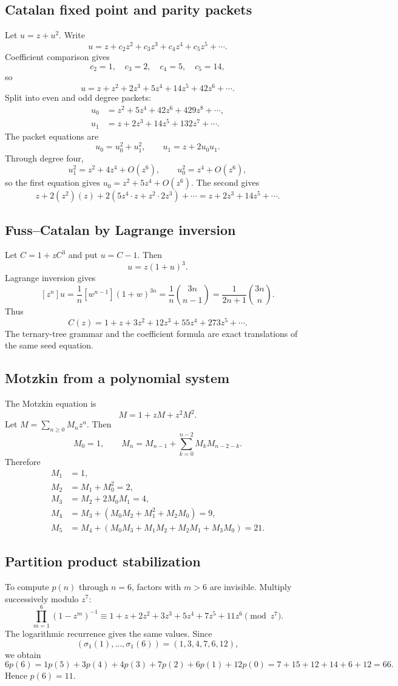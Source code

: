 \documentclass[11pt]{article}
\theoremstyle{definition}\newtheorem{definition}[theorem]{Definition}\newtheorem{example}[theorem]{Example}\newtheorem{construction}[theorem]{Construction}\newtheorem{algorithm}[theorem]{Algorithm}\newtheorem{conjecture}[theorem]{Conjecture}\newtheorem{problem}[theorem]{Problem}
\theoremstyle{remark}\newtheorem{remark}[theorem]{Remark}\newtheorem{boundary}[theorem]{Boundary}\newtheorem{certificate}[theorem]{Computational Certificate}\newtheorem{classical}[theorem]{Classical Input}\newtheorem{principle}[theorem]{Structural Principle}
\begin{document}
\subsection{Catalan fixed point and parity packets}
Let $u=z+u^2$.  Write
\[
 u=z+c_2z^2+c_3z^3+c_4z^4+c_5z^5+\cdots.
\]
Coefficient comparison gives
\[
 c_2=1,
 \quad c_3=2,
 \quad c_4=5,
 \quad c_5=14,
\]
so
\[
 u=z+z^2+2z^3+5z^4+14z^5+42z^6+\cdots.
\]
Split into even and odd degree packets:
\[
\begin{aligned}
 u_0&=z^2+5z^4+42z^6+429z^8+\cdots,\\
 u_1&=z+2z^3+14z^5+132z^7+\cdots.
\end{aligned}
\]
The packet equations are
\[
 u_0=u_0^2+u_1^2,
 \qquad
 u_1=z+2u_0u_1.
\]
Through degree four,
\[
 u_1^2=z^2+4z^4+O(z^6),
 \qquad
 u_0^2=z^4+O(z^6),
\]
so the first equation gives $u_0=z^2+5z^4+O(z^6)$.  The second gives
\[
 z+2(z^2)(z)+2(5z^4\cdot z+z^2\cdot2z^3)+\cdots
 =z+2z^3+14z^5+\cdots.
\]

\subsection{Fuss--Catalan by Lagrange inversion}
Let $C=1+zC^3$ and put $u=C-1$.  Then
\[
 u=z(1+u)^3.
\]
Lagrange inversion gives
\[
 [z^n]u=\frac1n[w^{n-1}](1+w)^{3n}
 =\frac1n\binom{3n}{n-1}
 =\frac1{2n+1}\binom{3n}{n}.
\]
Thus
\[
 C(z)=1+z+3z^2+12z^3+55z^4+273z^5+\cdots.
\]
The ternary-tree grammar and the coefficient formula are exact translations of the same seed equation.

\subsection{Motzkin from a polynomial system}
The Motzkin equation is
\[
 M=1+zM+z^2M^2.
\]
Let $M=\sum_{n\geq0}M_nz^n$.  Then
\[
 M_0=1,
 \qquad
 M_n=M_{n-1}+\sum_{k=0}^{n-2}M_kM_{n-2-k}.
\]
Therefore
\[
\begin{aligned}
M_1&=1,\\
M_2&=M_1+M_0^2=2,\\
M_3&=M_2+2M_0M_1=4,\\
M_4&=M_3+(M_0M_2+M_1^2+M_2M_0)=9,\\
M_5&=M_4+(M_0M_3+M_1M_2+M_2M_1+M_3M_0)=21.
\end{aligned}
\]

\subsection{Partition product stabilization}
To compute $p(n)$ through $n=6$, factors with $m>6$ are invisible.  Multiply successively modulo $z^7$:
\[
 \prod_{m=1}^{6}(1-z^m)^{-1}
 \equiv
 1+z+2z^2+3z^3+5z^4+7z^5+11z^6
 \pmod{z^7}.
\]
The logarithmic recurrence gives the same values.  Since
\[
 (\sigma_1(1),\ldots,\sigma_1(6))=(1,3,4,7,6,12),
\]
we obtain
\[
 6p(6)=1p(5)+3p(4)+4p(3)+7p(2)+6p(1)+12p(0)
 =7+15+12+14+6+12=66.
\]
Hence $p(6)=11$.
\end{document}
